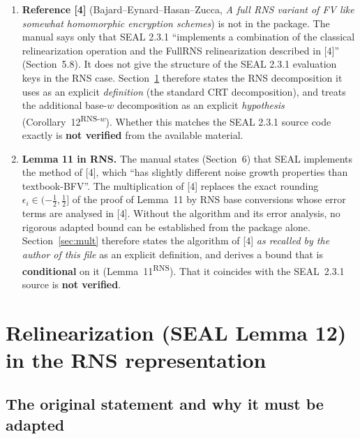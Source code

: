 \documentclass[11pt]{article}
\theoremstyle{plain}
\theoremstyle{definition}
\theoremstyle{remark}
\begin{document}
\begin{enumerate}[leftmargin=2em]
\item \textbf{Reference [4]} (Bajard--Eynard--Hasan--Zucca, \emph{A full RNS variant
      of FV like somewhat homomorphic encryption schemes}) is not in the package.
      The manual says only that SEAL 2.3.1 ``implements a combination of the
      classical relinearization operation and the FullRNS relinearization
      described in [4]'' (Section~5.8). It does not give the structure of the
      SEAL 2.3.1 evaluation keys in the RNS case. Section~\ref{sec:relin} therefore
      states the RNS decomposition it uses as an explicit \emph{definition}
      (the standard CRT decomposition), and treats the additional base-$w$
      decomposition as an explicit \emph{hypothesis} (Corollary~12\textsuperscript{RNS-$w$}).
      Whether this matches the SEAL 2.3.1 source code exactly is \textbf{not
      verified} from the available material.
\item \textbf{Lemma 11 in RNS.} The manual states (Section~6) that SEAL
      implements the method of [4], which ``has slightly different noise growth
      properties than textbook-BFV''. The multiplication of [4] replaces the
      exact rounding $\epsilon_i\in(-\frac12,\frac12]$ of the proof of Lemma~11 by
      RNS base conversions whose error terms are analysed in [4]. Without
      the algorithm and its error analysis, no rigorous adapted bound can be
      established from the package alone. Section~\ref{sec:mult} therefore states the algorithm of [4]
      \emph{as recalled by the author of this file} as an explicit definition, and derives a bound
      that is \textbf{conditional} on it (Lemma~11\textsuperscript{RNS}). That it coincides with the
      SEAL~2.3.1 source is \textbf{not verified}.
\end{enumerate}

\section{Relinearization (SEAL Lemma 12) in the RNS representation}
\label{sec:relin}

\subsection{The original statement and why it must be adapted}
\end{document}
